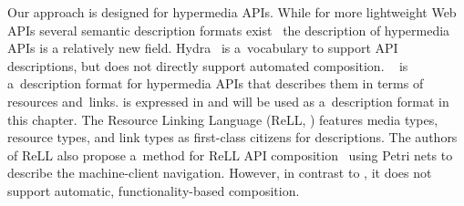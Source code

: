 Our approach is designed for hypermedia APIs. While for more lightweight Web APIs several semantic description formats exist~\cite{verborgh_rest_2014}
% 
the description of hypermedia APIs is a relatively new field.
Hydra~\cite{HydraVocabulary} is a~vocabulary to support API descriptions,
but does not directly support automated composition.
\restdesc~\cite{verborgh_wsrest_2012}
is a~description format
for hypermedia APIs that describes them in terms of resources and~links.
\restdesc is expressed in \nthree
and will be used as a~description format in this chapter.
The Resource Linking Language (ReLL, \cite{ReLL}) features media types, resource types, and link types as first-class citizens for descriptions.
The authors of ReLL also propose a~method
for ReLL API composition~\cite{ReLLComposition}
using Petri nets to describe the machine-client navigation.
However, in contrast to \restdesc, it does not support
automatic, functionality-based composition.

